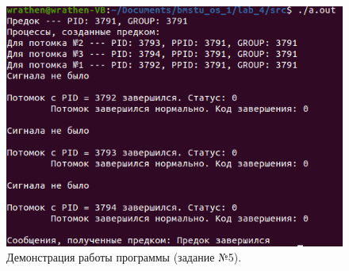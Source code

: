 \documentclass[12pt]{report}
\begin{document}
	\begin{figure}[H]
		
		\centering
		
		\includegraphics[width=\linewidth]{img/task_05.png}
		\caption{Демонстрация работы программы (задание №5).}
		
		\label{fig:task_05}
		
	\end{figure}
\end{document}
